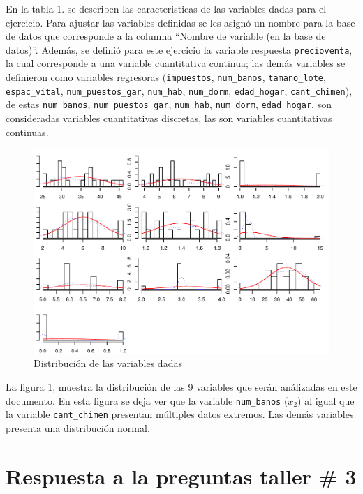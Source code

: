 \documentclass[
]{article}
\begin{document}
En la tabla 1. se describen las caracteristicas de las variables dadas
para el ejercicio. Para ajustar las variables definidas se les asignó un
nombre para la base de datos que corresponde a la columna ``Nombre de
variable (en la base de datos)''. Además, se definió para este ejercicio
la variable respuesta \texttt{precioventa}, la cual corresponde a una
variable cuantitativa continua; las demás variables se definieron como
variables regresoras (\texttt{impuestos}, \texttt{num\_banos},
\texttt{tamano\_lote}, \texttt{espac\_vital},
\texttt{num\_puestos\_gar}, \texttt{num\_hab}, \texttt{num\_dorm},
\texttt{edad\_hogar}, \texttt{cant\_chimen}), de estas
\texttt{num\_banos}, \texttt{num\_puestos\_gar}, \texttt{num\_hab},
\texttt{num\_dorm}, \texttt{edad\_hogar}, son consideradas variables
cuantitativas discretas, las son variables cuantitativas continuas.

\begin{figure}
\centering
\includegraphics{diagnosticorrpp_files/figure-latex/distribuciones de las variables dadas-1.pdf}
\caption{Distribución de las variables dadas}
\end{figure}

La figura 1, muestra la distribución de las 9 variables que serán
análizadas en este documento. En esta figura se deja ver que la variable
\texttt{num\_banos} (\(x_2\)) al igual que la variable
\texttt{cant\_chimen} presentan múltiples datos extremos. Las demás
variables presenta una distribución normal.

\hypertarget{respuesta-a-la-preguntas-taller-3}{%
\section{Respuesta a la preguntas taller \#
3}\label{respuesta-a-la-preguntas-taller-3}}
\end{document}
